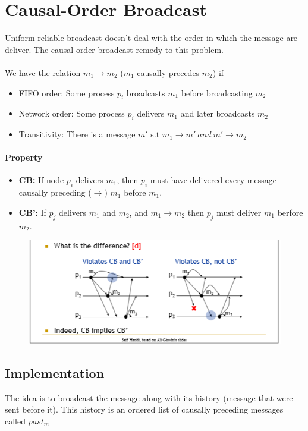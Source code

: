 \section{Causal-Order Broadcast}
Uniform reliable broadcast doesn't deal with the order in which the
message are deliver. The causal-order broadcast remedy to this
problem.

\paragraph{}
We have the relation $m_1 \to m_2$ ($m_1$ causally precedes $m_2$) if
\begin{itemize}
    \item FIFO order: Some process $p_i$ broadcasts $m_1$ before
        broadcasting $m_2$
    \item Network order: Some process $p_i$ delivers $m_1$ and
        later broadcasts $m_2$
    \item Transitivity: There is a message $m'$ s.t $m_1 \to m' \ and \ m'\to m_2$
\end{itemize}
\paragraph{Property}
\begin{itemize}
    \item \textbf{CB:} If node $p_i$ delivers $m_1$, then $p_i$ must have
        delivered every message causally preceding ($\to$) $m_1$ before $m_1$.
    \item \textbf{CB':} If $p_j$ delivers $m_1$ and $m_2$, and $m_1\to m_2$
        then $p_j$ must deliver $m_1$ berfore $m_2$.
\end{itemize}

\begin{figure}[!ht]
    \centering
    \includegraphics[scale=0.8]{img/cbs_properties.png}
\end{figure}
\FloatBarrier{}

\subsection{Implementation}
The idea is to broadcast the message along with its history (message
that were sent before it). This history is an ordered list of
causally preceding messages called $past_m$

